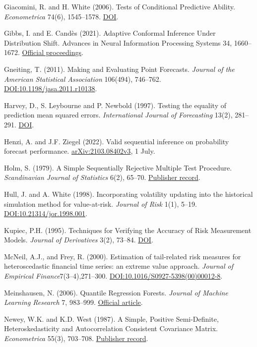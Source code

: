 \documentclass[11pt,a4paper]{article}
\begin{document}
Giacomini, R. and H. White (2006). Tests of Conditional Predictive Ability. \emph{Econometrica} 74(6), 1545--1578. \href{https://doi.org/10.1111/j.1468-0262.2006.00718.x}{DOI}.

Gibbs, I. and E. Candès (2021). Adaptive Conformal Inference Under Distribution Shift. Advances in Neural Information Processing Systems 34, 1660--1672. \href{https://papers.nips.cc/paper/2021/hash/0d441de75945e5acbc865406fc9a2559-Abstract.html}{Official proceedings}.

Gneiting, T. (2011). Making and Evaluating Point Forecasts. \emph{Journal of the American Statistical Association} 106(494), 746--762. \href{https://doi.org/10.1198/jasa.2011.r10138}{DOI:10.1198/jasa.2011.r10138}.

Harvey, D., S. Leybourne and P. Newbold (1997). Testing the equality of prediction mean squared errors. \emph{International Journal of Forecasting} 13(2), 281--291. \href{https://doi.org/10.1016/S0169-2070(96)00719-4}{DOI}.

Henzi, A. and J.F. Ziegel (2022). Valid sequential inference on probability forecast performance. \href{https://arxiv.org/abs/2103.08402v3}{arXiv:2103.08402v3}, 1 July.

Holm, S. (1979). A Simple Sequentially Rejective Multiple Test Procedure. \emph{Scandinavian Journal of Statistics} 6(2), 65--70. \href{https://www.jstor.org/stable/4615733}{Publisher record}.

Hull, J. and A. White (1998). Incorporating volatility updating into the historical simulation method for value-at-risk. \emph{Journal of Risk} 1(1), 5--19. \href{https://doi.org/10.21314/jor.1998.001}{DOI:10.21314/jor.1998.001}.

Kupiec, P.H. (1995). Techniques for Verifying the Accuracy of Risk Measurement Models. \emph{Journal of Derivatives} 3(2), 73--84. \href{https://doi.org/10.3905/jod.1995.407942}{DOI}.

McNeil, A.J., and Frey, R. (2000). Estimation of tail-related risk measures for heteroscedastic financial time series: an extreme value approach. \emph{Journal of Empirical Finance}7(3--4),271--300. \href{https://doi.org/10.1016/S0927-5398(00)00012-8}{DOI:10.1016/S0927-5398(00)00012-8}.

Meinshausen, N. (2006). Quantile Regression Forests. \emph{Journal of Machine Learning Research} 7, 983--999. \href{https://www.jmlr.org/papers/volume7/meinshausen06a/meinshausen06a.pdf}{Official article}.

Newey, W.K. and K.D. West (1987). A Simple, Positive Semi-Definite, Heteroskedasticity and Autocorrelation Consistent Covariance Matrix. \emph{Econometrica} 55(3), 703--708. \href{https://www.jstor.org/stable/1913610}{Publisher record}.
\end{document}
